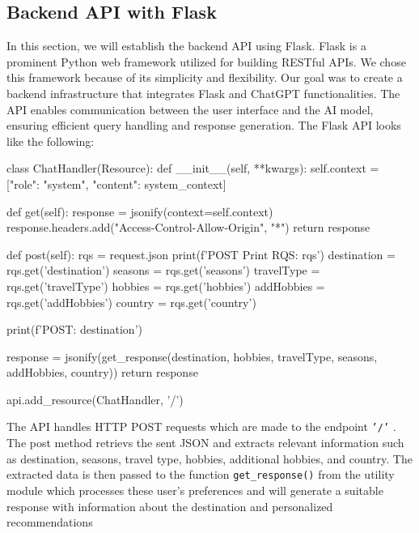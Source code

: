 \documentclass[english,notitlepage,smartquotes]{hgbreport}
\begin{document}
\subsection{Backend API with Flask}\label{Backend}
In this section, we will establish the backend API using Flask. Flask is a prominent Python web framework utilized for building RESTful APIs. We chose this framework because of its simplicity and flexibility. Our goal was to create a backend infrastructure that integrates Flask and ChatGPT functionalities. The API enables communication between the user interface and the AI model, ensuring efficient query handling and response generation. The Flask API looks like the following:
\begin{PythonCode}
	class ChatHandler(Resource):
	def __init__(self, **kwargs):
	self.context = [{"role": "system", "content": system_context}]
	
	def get(self):
	response = jsonify(context=self.context)
	response.headers.add("Access-Control-Allow-Origin", "*")
	return response
	
	def post(self):
	rqs = request.json
	print(f'POST Print RQS: {rqs}\n')
	destination = rqs.get('destination')
	seasons = rqs.get('seasons')
	travelType = rqs.get('travelType')
	hobbies = rqs.get('hobbies')
	addHobbies = rqs.get('addHobbies')
	country = rqs.get('country')
	
	print(f'POST: {destination}\n')
	
	response = jsonify(get_response(destination, hobbies, travelType, seasons, addHobbies, country))
	return response
	
	
	api.add_resource(ChatHandler, '/')
\end{PythonCode}
The API handles HTTP POST requests which are made to the endpoint \texttt{'/'} . The post method retrievs the sent JSON and extracts relevant information such as destination, seasons, travel type, hobbies, additional hobbies, and country. The extracted data is then passed to the function \texttt{get\_response()} from the utility module which processes these user's preferences and will generate a suitable response with information about the destination and personalized recommendations
\end{document}
